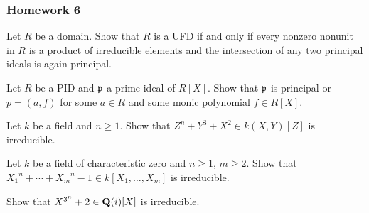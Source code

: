 \subsubsection{Homework 6}
\setcounter{exercise}{0}
\setcounter{equation}{0}

\begin{problem}
Let $R$ be a domain. Show that $R$ is a UFD if and only if every nonzero
nonunit in $R$ is a product of irreducible elements and the intersection of
any two principal ideals is again principal.
\end{problem}
\begin{solution}
\end{solution}

\begin{problem}
Let $R$ be a PID and $\mathfrak{p}$ a prime ideal of $R[X]$. Show that $\mathfrak{p}$
is principal or $p=(a,f)$ for some $a\in R$ and some monic polynomial $f\in
R[X]$.
\end{problem}
\begin{solution}
\end{solution}

\begin{problem}
Let $k$ be a field and $n\geq 1$. Show that $Z^n+Y^3+X^2\in k(X,Y)[Z]$ is
irreducible.
\end{problem}
\begin{solution}
\end{solution}

\begin{problem}
Let $k$ be a field of characteristic zero and $n\geq 1$, $m\geq 2$. Show
that ${X_1}^n+\dotsb+{X_m}^n-1\in k[X_1,\dotsc,X_m]$ is irreducible.
\end{problem}
\begin{solution}
\end{solution}

\begin{problem}
Show that $X^{3^n}+2\in\mathbf{Q}(i)[X]$ is irreducible.
\end{problem}
\begin{solution}
\end{solution}

